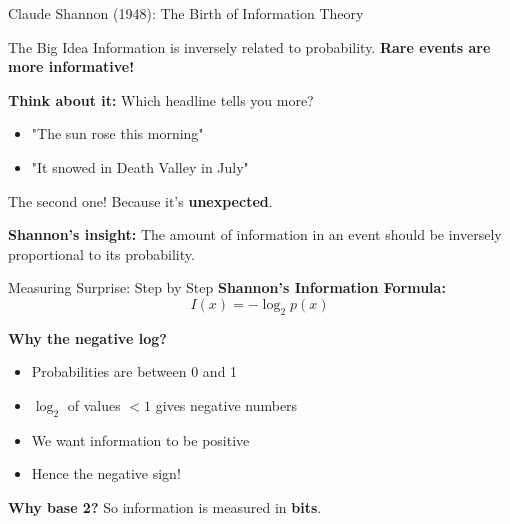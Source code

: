 \documentclass[usenames,dvipsnames]{beamer}
\begin{document}

\begin{frame}{Claude Shannon (1948): The Birth of Information Theory}
\begin{definitionbox}{The Big Idea}
Information is inversely related to probability. \textbf{Rare events are more informative!}
\end{definitionbox}

\pause
\textbf{Think about it:} Which headline tells you more?
\begin{itemize}
\item "The sun rose this morning" 
\item "It snowed in Death Valley in July"
\end{itemize}

\pause
The second one! Because it's \textbf{unexpected}.

\pause
\textbf{Shannon's insight:} The amount of information in an event should be inversely proportional to its probability.
\end{frame}

\begin{frame}{Measuring Surprise: Step by Step}
\textbf{Shannon's Information Formula:}
$$I(x) = -\log_2 p(x)$$

\pause
\textbf{Why the negative log?}
\begin{itemize}
\item Probabilities are between 0 and 1
\item $\log_2$ of values $< 1$ gives negative numbers
\item We want information to be positive
\item Hence the negative sign!
\end{itemize}

\pause
\textbf{Why base 2?} So information is measured in \textbf{bits}.
\end{frame}
\end{document}
